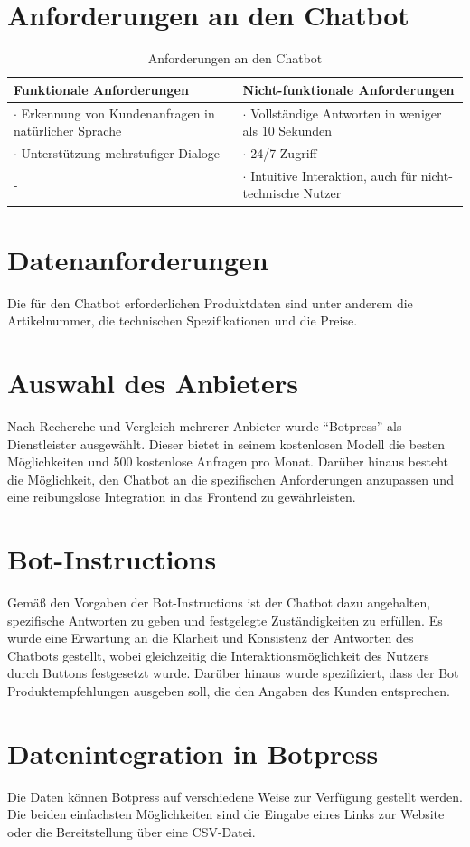 \documentclass[%
	12pt,
	a4paper,
	oneside,
	parskip=full
]{scrbook}
\begin{document}
\section{Anforderungen an den Chatbot}
\begin{table}[ht]
	\centering
	\begin{tabularx}{\textwidth}{X|X}
		Funktionale Anforderungen&Nicht-funktionale Anforderungen\\ \hline \hline
		$\cdot$ Erkennung von Kundenanfragen in natürlicher Sprache & $\cdot$ Vollständige Antworten in weniger als 10 Sekunden\\
		$\cdot$ Unterstützung mehrstufiger Dialoge & $\cdot$ 24/7-Zugriff\\
		- & $\cdot$ Intuitive Interaktion, auch für nicht-technische Nutzer\\
	\end{tabularx}
	\caption{Anforderungen an den Chatbot}
\end{table}
\section{Datenanforderungen}
Die für den Chatbot erforderlichen Produktdaten sind unter anderem die Artikelnummer, die technischen Spezifikationen und die Preise.
\section{Auswahl des Anbieters}
Nach Recherche und Vergleich mehrerer Anbieter wurde \enquote{Botpress} als Dienstleister ausgewählt. 
Dieser bietet in seinem kostenlosen Modell die besten Möglichkeiten und 500 kostenlose Anfragen pro Monat.
Darüber hinaus besteht die Möglichkeit, den Chatbot an die spezifischen Anforderungen anzupassen und eine reibungslose Integration in das Frontend zu gewährleisten.
\section{Bot-Instructions}
Gemäß den Vorgaben der Bot-Instructions ist der Chatbot dazu angehalten, spezifische Antworten zu geben und festgelegte Zuständigkeiten zu erfüllen. Es wurde eine Erwartung an die Klarheit und Konsistenz der Antworten des Chatbots gestellt, wobei gleichzeitig die Interaktionsmöglichkeit des Nutzers durch Buttons festgesetzt wurde. Darüber hinaus wurde spezifiziert, dass der Bot Produktempfehlungen ausgeben soll, die den Angaben des Kunden entsprechen. 
\section{Datenintegration in Botpress}
Die Daten können Botpress auf verschiedene Weise zur Verfügung gestellt werden. 
Die beiden einfachsten Möglichkeiten sind die Eingabe eines Links zur Website oder die Bereitstellung über eine CSV-Datei.
\end{document}

